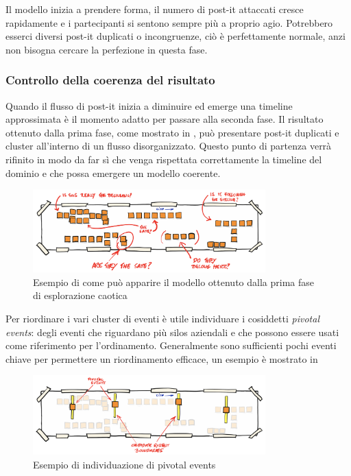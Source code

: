 Il modello inizia a prendere forma, il numero di post-it attaccati cresce rapidamente e i partecipanti si sentono sempre più a proprio agio. Potrebbero esserci diversi post-it duplicati o incongruenze, ciò è perfettamente normale, anzi non bisogna cercare la perfezione in questa fase. 

\subsubsection{Controllo della coerenza del risultato}
\label{sec:prima-riunione-controllo-della-coerenza-del-risultato}

Quando il flusso di post-it inizia a diminuire ed emerge una timeline approssimata è il momento adatto per passare alla seconda fase. Il risultato ottenuto dalla prima fase, come mostrato in , può presentare post-it duplicati e cluster all'interno di un flusso disorganizzato. Questo punto di partenza verrà rifinito in modo da far sì che venga rispettata correttamente la timeline del dominio e che possa emergere un modello coerente.

\begin{figure}[!ht]
  \centering
  \includegraphics[width=0.8\textwidth]{images/event-storming-exploration.png}
  \caption{Esempio di come può apparire il modello ottenuto dalla prima fase di esplorazione caotica}
  \label{fig:event-storming-exploration}
\end{figure}

Per riordinare i vari cluster di eventi è utile individuare i cosiddetti \emph{pivotal events}: degli eventi che riguardano più silos aziendali e che possono essere usati come riferimento per l'ordinamento. Generalmente sono sufficienti pochi eventi chiave per permettere un riordinamento efficace, un esempio è mostrato in 

\begin{figure}[!ht]
  \centering
  \includegraphics[width=0.8\textwidth]{images/event-storming-pivotal-events.png}
  \caption{Esempio di individuazione di pivotal events}
  \label{fig:event-storming-pivotal-events}
\end{figure}


